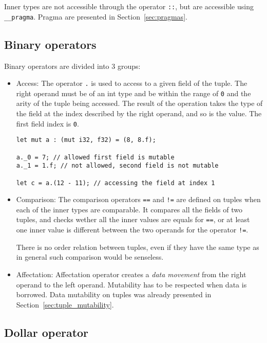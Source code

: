 \smallskip

Inner types are not accessible through the operator \texttt{::}, but are
accessible using \texttt{\_\_pragma}. Pragma are presented in
Section~\ref{sec:pragmas}.

\subsection {Binary operators}

Binary operators are divided into 3 groups:
\begin{itemize}
\item Access: The operator \texttt{.} is used to access to a given field of the
  tuple. The right operand must be of an int type and be within the range of
  \texttt{0} and the arity of the tuple being accessed. The result of the
  operation takes the type of the field at the index described by the right
  operand, and so is the value. The first field index is \texttt{0}.

  \begin{lstlisting}[style=coloredverbatim, linewidth=0.95\linewidth]
let mut a : (mut i32, f32) = (8, 8.f);

a._0 = 7; // allowed first field is mutable
a._1 = 1.f; // not allowed, second field is not mutable

let c = a.(12 - 11); // accessing the field at index 1
  \end{lstlisting}

\item Comparison: The comparison operators \texttt{==} and \texttt{!=} are
  defined on tuples when each of the inner types are comparable. It compares all
  the fields of two tuples, and checks wether all the inner values are equals
  for \texttt{==}, or at least one inner value is different between the two
  operands for the operator \texttt{!=}.

  There is no order relation between tuples, even if they have the same type as
  in general such comparison would be senseless.

\item Affectation: Affectation operator creates a \textit{data movement} from
  the right operand to the left operand. Mutability has to be respected when
  data is borrowed. Data mutability on tuples was already presented in
  Section~\ref{sec:tuple_mutability}.

\end{itemize}

\subsection {Dollar operator}

